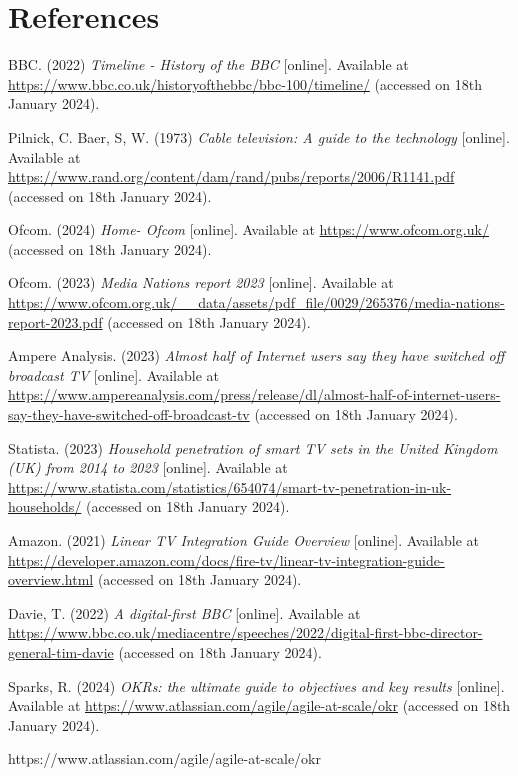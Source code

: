 \section{References}

\noindent [1] BBC. (2022) \textit{Timeline - History of the BBC} [online]. Available at \url{https://www.bbc.co.uk/historyofthebbc/bbc-100/timeline/} (accessed on 18th January 2024).
\vspace{0.2cm}

\noindent [2] Pilnick, C. Baer, S, W. (1973) \textit{Cable television: A guide to the technology} [online]. Available at \url{https://www.rand.org/content/dam/rand/pubs/reports/2006/R1141.pdf} (accessed on 18th January 2024).
\vspace{0.2cm}

\noindent [3] Ofcom. (2024) \textit{Home- Ofcom} [online]. Available at \url{https://www.ofcom.org.uk/} (accessed on 18th January 2024).
\vspace{0.2cm}

\noindent [4] Ofcom. (2023) \textit{Media Nations report 2023} [online]. Available at \url{https://www.ofcom.org.uk/__data/assets/pdf_file/0029/265376/media-nations-report-2023.pdf} (accessed on 18th January 2024).
\vspace{0.2cm}

\noindent [5] Ampere Analysis. (2023) \textit{Almost half of Internet users say they have switched off broadcast TV} [online]. Available at \url{https://www.ampereanalysis.com/press/release/dl/almost-half-of-internet-users-say-they-have-switched-off-broadcast-tv} (accessed on 18th January 2024).
\vspace{0.2cm}

\noindent [6] Statista. (2023) \textit{Household penetration of smart TV sets in the United Kingdom (UK) from 2014 to 2023} [online]. Available at \url{https://www.statista.com/statistics/654074/smart-tv-penetration-in-uk-households/} (accessed on 18th January 2024).
\vspace{0.2cm}

\noindent [7] Amazon. (2021) \textit{Linear TV Integration Guide Overview} [online]. Available at \url{https://developer.amazon.com/docs/fire-tv/linear-tv-integration-guide-overview.html} (accessed on 18th January 2024).
\vspace{0.2cm}

\noindent [8] Davie, T. (2022) \textit{A digital-first BBC} [online]. Available at \url{https://www.bbc.co.uk/mediacentre/speeches/2022/digital-first-bbc-director-general-tim-davie} (accessed on 18th January 2024).
\vspace{0.2cm}

\noindent [9] Sparks, R. (2024) \textit{OKRs: the ultimate guide to objectives and key results } [online]. Available at \url{https://www.atlassian.com/agile/agile-at-scale/okr} (accessed on 18th January 2024).
\vspace{0.2cm}

\newpage
https://www.atlassian.com/agile/agile-at-scale/okr